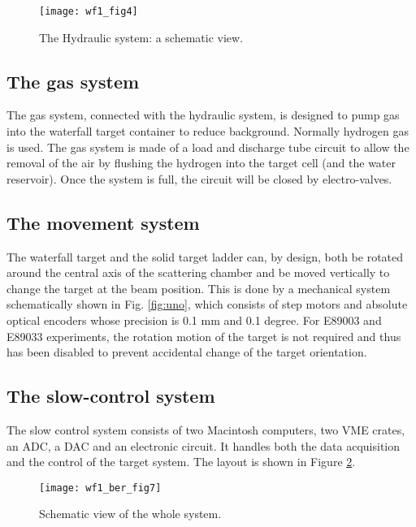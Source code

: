 \begin{figure}[htp]
\begin{center}
\texttt{[image: wf1\_fig4]}
\caption[Waterfall Target: Hydraulic Schematic]{The Hydraulic system: a schematic view.}
\label{fig:acqua}
\end{center}
\end{figure}


\subsection{The gas system}

The gas system, connected with the hydraulic system,  
is designed to pump gas into the waterfall target container to reduce 
background. Normally hydrogen gas is used. The gas system is made of 
a load and discharge tube circuit to allow the removal of 
the air by flushing the hydrogen into the target cell (and the water 
reservoir). Once the system is full, the circuit will be
closed by electro-valves. 

\subsection{The movement system}

The waterfall target and the solid target ladder can, by design, both 
be rotated around the central axis of the scattering chamber 
and be moved vertically to change the target at the beam 
position. This is done by a mechanical system schematically shown in 
Fig. \ref{fig:uno}, which consists of step motors and absolute optical 
encoders whose precision is 0.1 mm and 0.1 degree.
For E89003 and E89033 experiments, the rotation motion of the target is not
required and thus has been disabled to prevent accidental change of the 
target orientation. 

\subsection{The slow-control system}

The slow control system consists of
two Macintosh computers, two VME crates, an ADC, a DAC and an electronic 
circuit. It handles both the data acquisition and the control of the target
system. The layout is shown in Figure \ref{fig:sette}.

\begin{figure}[htp]
\begin{center}
\texttt{[image: wf1\_ber\_fig7]}
\caption[Waterfall Target: Schematic]{Schematic view of the whole system.}
\label{fig:sette}
\end{center}
\end{figure}

